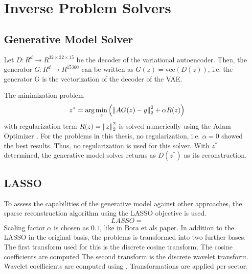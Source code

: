 \section{Inverse Problem Solvers}

\subsection{Generative Model Solver}
Let $D: R^d \rightarrow R^{32 \times 32 \times 15}$ be the decoder of the variational autoencoder.
Then, the generator $G: R^d \rightarrow R^{15360}$ can be written as $G(z) = \text{vec}(D(z))$, i.e. the generator G is the vectorization of the decoder of the VAE.

The minimization problem
\begin{equation}
    z^* = \arg\min_{z}{\left( \left\lVert A G(z) - y\right\rVert_2^2 + \alpha R(z) \right)}
\end{equation}
with regularization term $R(z) = \left\lVert z\right\rVert_2^2$ is solved numerically using the Adam Optimizer \parencite{Adam}.
For the problems in this thesis, no regularization, i.e. $\alpha = 0$ showed the best results.
Thus, no regularization is used for this solver.
With $z^*$ determined, the generative model solver returns as $D(z^*)$ as its reconstruction.

\subsection{LASSO}
To assess the capabilities of the generative model against other approaches, the sparse reconstruction algorithm using the LASSO objective is used.
\begin{equation}
    LASSO = 
\end{equation}
Scaling factor $\alpha$ is chosen as $0.1$, like in Bora et als paper.
In addition to the LASSO in the original basis, the problems is transformed into two further bases.
The first transform used for this is the discrete cosine transform.
The cosine coefficients are computed
The second transform is the discrete wavelet transform.
Wavelet coefficients are computed using \parencite{PyWavelets}.
Transformations are applied per sector.
